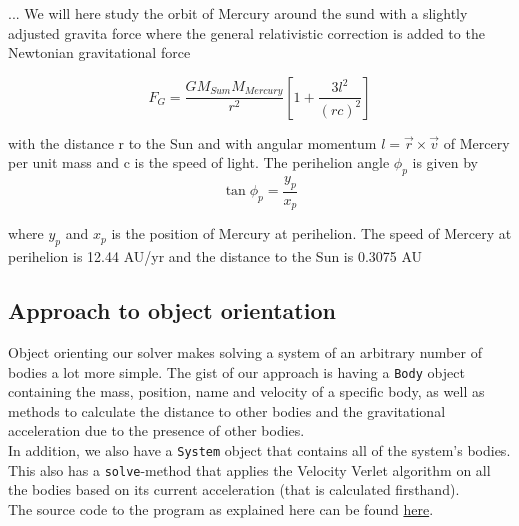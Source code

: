 \documentclass[../main.tex]{subfiles}
\begin{document}
...
We will here study the orbit of Mercury around the sund with a slightly adjusted gravita force where the general relativistic correction is added to the Newtonian gravitational force

\begin{equation}
  F_G = \frac{GM_{Sum}M_{Mercury}}{r^2} \left[ 1+\frac {3l^2}{(rc)^2} \right]
\end{equation}

 with the distance r to the Sun and with angular momentum $l = \vec r \times \vec v$ of Mercery per unit mass and c is the speed of light. The perihelion angle $\phi_p$ is given by
$$\tan \phi_p = \frac{y_p}{x_p}$$

where $y_p$ and $x_p$ is the position of Mercury at perihelion. The speed of Mercery at perihelion is 12.44 AU/yr and the distance to the Sun is 0.3075 AU

\subsection{Approach to object orientation}
Object orienting our solver makes solving a system of an arbitrary number of bodies a lot more simple. The gist of our approach is having a \verb+Body+ object containing the mass, position, name and velocity of a specific body, as well as methods to calculate the distance to other bodies and the gravitational acceleration due to the presence of other bodies. \\
In addition, we also have a \verb+System+ object that contains all of the system's bodies. This also has a \verb+solve+-method that applies the Velocity Verlet algorithm on all the bodies based on its current acceleration (that is calculated firsthand). \\
The source code to the program as explained here can be found \href{https://github.com/kmaasrud/Project-5/tree/master/code/complete_solar-system}{here}.
\end{document}

